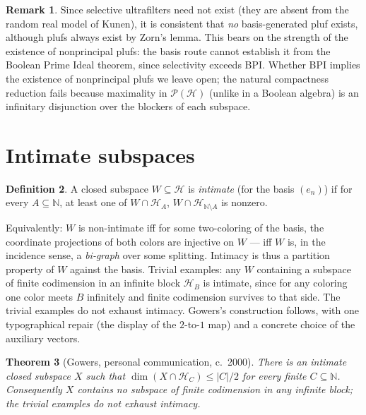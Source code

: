 \documentclass[11pt,reqno]{amsart}
\newtheorem{theorem}{Theorem}[section]
\theoremstyle{definition}
\newtheorem{definition}[theorem]{Definition}
\newtheorem{remark}[theorem]{Remark}
\newcommand{\HH}{\mathcal{H}}
\newcommand{\PP}{\mathcal{P}}
\newcommand{\N}{\mathbb{N}}
\begin{document}
\begin{remark}
Since selective ultrafilters need not exist (they are absent from the random real model
of Kunen), it is consistent that \emph{no} basis-generated pluf exists, although plufs
always exist by Zorn's lemma. This bears on the strength of the existence of
nonprincipal plufs: the basis route cannot establish it from the Boolean Prime Ideal
theorem, since selectivity exceeds BPI. Whether BPI implies the existence of
nonprincipal plufs we leave open; the natural compactness reduction fails because
maximality in $\PP(\HH)$ (unlike in a Boolean algebra) is an infinitary disjunction over
the blockers of each subspace.
\end{remark}

\section{Intimate subspaces}\label{sec:intimate}

\begin{definition}\label{def:intimate}
A closed subspace $W\subseteq\HH$ is \emph{intimate} (for the basis $(e_n)$) if for
every $A\subseteq\N$, at least one of $W\cap\HH_A$, $W\cap\HH_{\N\setminus A}$ is
nonzero.
\end{definition}

Equivalently: $W$ is non-intimate iff for some two-coloring of the basis, the
coordinate projections of both colors are injective on $W$ --- iff $W$ is, in the
incidence sense, a \emph{bi-graph} over some splitting. Intimacy is thus a partition
property of $W$ against the basis. Trivial examples: any $W$ containing a subspace of
finite codimension in an infinite block $\HH_B$ is intimate, since for any coloring one
color meets $B$ infinitely and finite codimension survives to that side. The trivial examples do not exhaust
intimacy. Gowers's construction follows, with one typographical repair (the display of
the $2$-to-$1$ map) and a concrete choice of the auxiliary vectors.

\begin{theorem}[Gowers, personal communication, c.~2000]\label{thm:gowers}
There is an intimate closed subspace $X$ such that $\dim(X\cap\HH_C)\le|C|/2$ for every
finite $C\subseteq\N$. Consequently $X$ contains no subspace of finite codimension in
any infinite block; the trivial examples do not exhaust intimacy.
\end{theorem}
\end{document}
